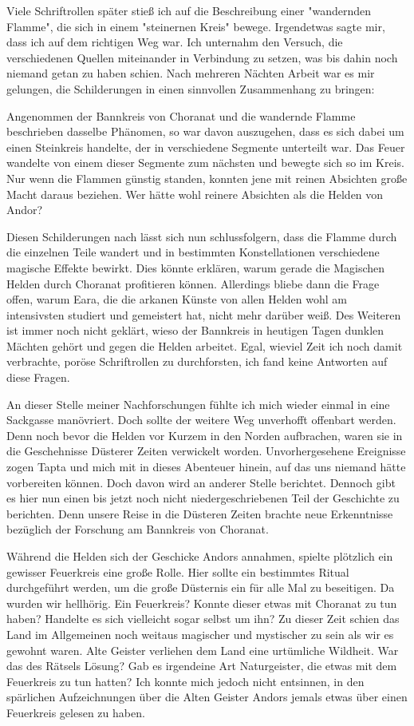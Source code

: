 \documentclass[10pt, a4paper, oneside]{book}
\begin{document}
\begin{multicols}{2}
Viele Schriftrollen später stieß ich auf die Beschreibung einer "wandernden Flamme", die sich in einem "steinernen Kreis" bewege. Irgendetwas sagte mir, dass ich auf dem richtigen Weg war. Ich unternahm den Versuch, die verschiedenen Quellen miteinander in Verbindung zu setzen, was bis dahin noch niemand getan zu haben schien. Nach mehreren Nächten Arbeit war es mir gelungen, die Schilderungen in einen sinnvollen Zusammenhang zu bringen:\bigskip

Angenommen der Bannkreis von Choranat und die wandernde Flamme beschrieben dasselbe Phänomen, so war davon auszugehen, dass es sich dabei um einen Steinkreis handelte, der in verschiedene Segmente unterteilt war. Das Feuer wandelte von einem dieser Segmente zum nächsten und bewegte sich so im Kreis. Nur wenn die Flammen günstig standen, konnten jene mit reinen Absichten große Macht daraus beziehen. Wer hätte wohl reinere Absichten als die Helden von Andor?\bigskip

Diesen Schilderungen nach lässt sich nun schlussfolgern, dass die Flamme durch die einzelnen Teile wandert und in bestimmten Konstellationen verschiedene magische Effekte bewirkt. Dies könnte erklären, warum gerade die Magischen Helden durch Choranat profitieren können. Allerdings bliebe dann die Frage offen, warum Eara, die die arkanen Künste von allen Helden wohl am intensivsten studiert und gemeistert hat, nicht mehr darüber weiß. Des Weiteren ist immer noch nicht geklärt, wieso der Bannkreis in heutigen Tagen dunklen Mächten gehört und gegen die Helden arbeitet. Egal, wieviel Zeit ich noch damit verbrachte, poröse Schriftrollen zu durchforsten, ich fand keine Antworten auf diese Fragen.\bigskip

An dieser Stelle meiner Nachforschungen fühlte ich mich wieder einmal in eine Sackgasse manövriert. Doch sollte der weitere Weg unverhofft offenbart werden. Denn noch bevor die Helden vor Kurzem in den Norden aufbrachen, waren sie in die Geschehnisse Düsterer Zeiten verwickelt worden. Unvorhergesehene Ereignisse zogen Tapta und mich mit in dieses Abenteuer hinein, auf das uns niemand hätte vorbereiten können. Doch davon wird an anderer Stelle berichtet. Dennoch gibt es hier nun einen bis jetzt noch nicht niedergeschriebenen Teil der Geschichte zu berichten. Denn unsere Reise in die Düsteren Zeiten brachte neue Erkenntnisse bezüglich der Forschung am Bannkreis von Choranat.\bigskip

Während die Helden sich der Geschicke Andors annahmen, spielte plötzlich ein gewisser Feuerkreis eine große Rolle. Hier sollte ein bestimmtes Ritual durchgeführt werden, um die große Düsternis ein für alle Mal zu beseitigen. Da wurden wir hellhörig. Ein Feuerkreis? Konnte dieser etwas mit Choranat zu tun haben? Handelte es sich vielleicht sogar selbst um ihn? Zu dieser Zeit schien das Land im Allgemeinen noch weitaus magischer und mystischer zu sein als wir es gewohnt waren. Alte Geister verliehen dem Land eine urtümliche Wildheit. War das des Rätsels Lösung? Gab es irgendeine Art Naturgeister, die etwas mit dem Feuerkreis zu tun hatten? Ich konnte mich jedoch nicht entsinnen, in den spärlichen Aufzeichnungen über die Alten Geister Andors jemals etwas über einen Feuerkreis gelesen zu haben.\bigskip


\end{multicols}
\end{document}
